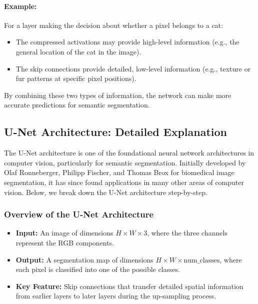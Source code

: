 \documentclass[letterpaper,12pt,notitlepage,twoside]{report}
\begin{document}
\paragraph{Example:}
For a layer making the decision about whether a pixel belongs to a cat:
\begin{itemize}
    \item The compressed activations may provide high-level information (e.g., the general location of the cat in the image).
    \item The skip connections provide detailed, low-level information (e.g., texture or fur patterns at specific pixel positions).
\end{itemize}

By combining these two types of information, the network can make more accurate predictions for semantic segmentation.

\subsection*{U-Net Architecture: Detailed Explanation}
The U-Net architecture is one of the foundational neural network architectures in computer vision, particularly for semantic segmentation. Initially developed by Olaf Ronneberger, Philipp Fischer, and Thomas Brox for biomedical image segmentation, it has since found applications in many other areas of computer vision. Below, we break down the U-Net architecture step-by-step.

\subsubsection*{Overview of the U-Net Architecture}

\begin{itemize}
    \item \textbf{Input:} An image of dimensions \( H \times W \times 3 \), where the three channels represent the RGB components.
    \item \textbf{Output:} A segmentation map of dimensions \( H \times W \times \text{num\_classes} \), where each pixel is classified into one of the possible classes.
    \item \textbf{Key Feature:} Skip connections that transfer detailed spatial information from earlier layers to later layers during the up-sampling process.
\end{itemize}
\end{document}
